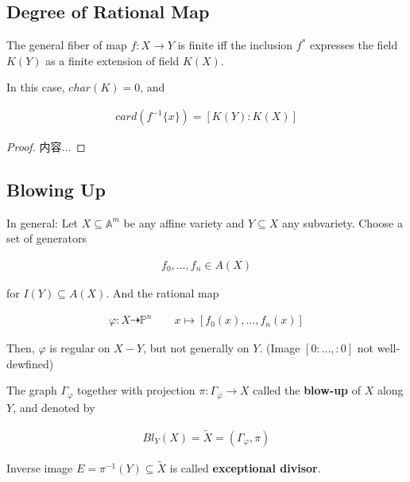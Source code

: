 \documentclass[Total.tex]{subfiles}
\begin{document}
		\subsection{Degree of Rational Map}
		
		\begin{proposition}
			The general fiber of map $f:X\rightarrow Y$ is finite iff the inclusion $f^*$ expresses the field $K(Y)$ as a finite extension of field $K(X)$.
			
			In this case, $char(K)=0$, and
			
			\begin{gather*}
				card(f^{-1}\{x\})=[K(Y):K(X)]
			\end{gather*}
		\end{proposition}
		
		\begin{proof}
			内容...
		\end{proof}
		
		\subsection{Blowing Up}
		
		\begin{Def}
			In general: Let $X\subseteq \mathbb{A}^m$ be any affine variety and $Y\subseteq X$ any subvariety. Choose a set of generators
			
			\begin{gather*}
				f_0,\dots,f_n\in A(X)
			\end{gather*}
			
			for $I(Y)\subseteq A(X)$. And the rational map
			
			\begin{gather*}
				\varphi:X\dashrightarrow \mathbb{P}^n\qquad x\mapsto [f_0(x),\dots,f_n(x)]
			\end{gather*}
			
			Then, $\varphi$ is regular on $X-Y$, but not generally on $Y$. (Image $[0:\dots,:0]$ not well-dewfined)
			
			The graph $\Gamma_\varphi$ together with projection $\pi:\Gamma_\varphi\rightarrow X$ called the \textbf{blow-up} of $X$ along $Y$, and denoted by
			
			\begin{gather*}
				Bl_Y(X)=\tilde{X}=(\Gamma_\varphi,\pi)
			\end{gather*}
			
			Inverse image $E=\pi^{-1}(Y)\subseteq \tilde{X}$ is called \textbf{exceptional divisor}.
		\end{Def}
		
\end{document}
